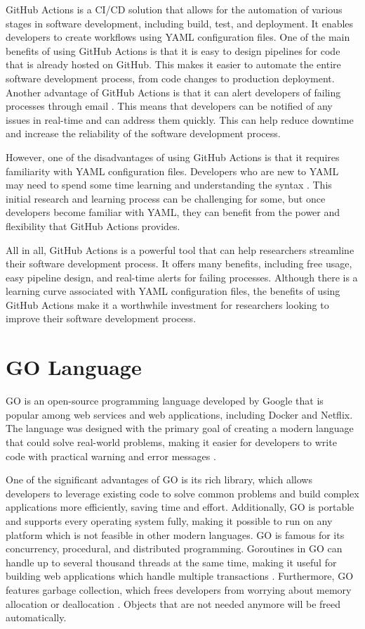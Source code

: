 GitHub Actions is a CI/CD solution that allows for the automation of various stages in software development, including build, test, and deployment. It enables developers to create workflows using YAML configuration files. One of the main benefits of using GitHub Actions is that it is easy to design pipelines for code that is already hosted on GitHub. This makes it easier to automate the entire software development process, from code changes to production deployment. Another advantage of GitHub Actions is that it can alert developers of failing processes through email \cite{kimetal}. This means that developers can be notified of any issues in real-time and can address them quickly. This can help reduce downtime and increase the reliability of the software development process.

However, one of the disadvantages of using GitHub Actions is that it requires familiarity with YAML configuration files. Developers who are new to YAML may need to spend some time learning and understanding the syntax \cite{ds}. This initial research and learning process can be challenging for some, but once developers become familiar with YAML, they can benefit from the power and flexibility that GitHub Actions provides.

All in all, GitHub Actions is a powerful tool that can help researchers streamline their software development process. It offers many benefits, including free usage, easy pipeline design, and real-time alerts for failing processes. Although there is a learning curve associated with YAML configuration files, the benefits of using GitHub Actions make it a worthwhile investment for researchers looking to improve their software development process.

\section{GO Language}
GO is an open-source programming language developed by Google that is popular among web services and web applications, including Docker and Netflix. The language was designed with the primary goal of creating a modern language that could solve real-world problems, making it easier for developers to write code with practical warning and error messages \cite{mihalis}. 

One of the significant advantages of GO is its rich library, which allows developers to leverage existing code to solve common problems and build complex applications more efficiently, saving time and effort. Additionally, GO is portable and supports every operating system fully, making it possible to run on any platform which is not feasible in other modern languages\cite{andrew}. GO is famous for its concurrency, procedural, and distributed programming. Goroutines in GO can handle up to several thousand threads at the same time, making it useful for building web applications which handle multiple transactions  \cite{andrew, cgptt}. Furthermore, GO features garbage collection, which frees developers from worrying about memory allocation or deallocation \cite{andrew}. Objects that are not needed anymore will be freed automatically.

